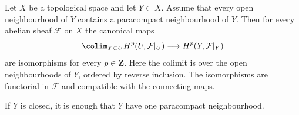 \begin{lemma}
\label{lemma-cohomology-colimit-paracompact-neighbourhoods}
\begin{reference}
\cite[Chapter III, \S 3.10, Corollary 2, p. 182]{Tohoku}
\end{reference}
Let $X$ be a topological space and let $Y\subset X$. Assume that every open
neighbourhood of $Y$ contains a paracompact neighbourhood of $Y$. Then for
every abelian sheaf $\mathcal{F}$ on $X$ the canonical maps
$$
\colim_{Y\subset U}H^p(U,\mathcal{F}|_U)
\longrightarrow H^p(Y,\mathcal{F}|_Y)
$$
are isomorphisms for every $p\in\mathbf{Z}$. Here the colimit is over the
open neighbourhoods of $Y$, ordered by reverse inclusion. The isomorphisms
are functorial in $\mathcal{F}$ and compatible with the connecting maps.

If $Y$ is closed, it is enough that $Y$ have one paracompact neighbourhood.
\end{lemma}

